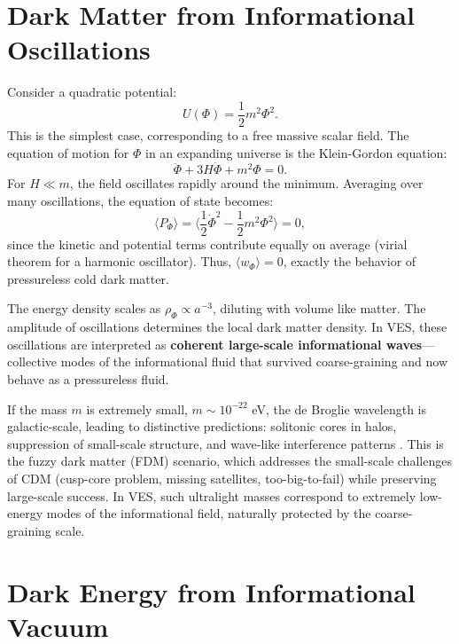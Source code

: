 \documentclass[12pt,a4paper]{book}
\begin{document}
\section{Dark Matter from Informational Oscillations}

Consider a quadratic potential:
\begin{equation}
    U(\Phi) = \frac12 m^2 \Phi^2.
\end{equation}
This is the simplest case, corresponding to a free massive scalar field. The equation of motion for $\Phi$ in an expanding universe is the Klein-Gordon equation:
\begin{equation}
    \ddot{\Phi} + 3H \dot{\Phi} + m^2 \Phi = 0.
\end{equation}
For $H \ll m$, the field oscillates rapidly around the minimum. Averaging over many oscillations, the equation of state becomes:
\begin{equation}
    \langle P_\Phi \rangle = \langle \frac12 \dot{\Phi}^2 - \frac12 m^2 \Phi^2 \rangle = 0,
\end{equation}
since the kinetic and potential terms contribute equally on average (virial theorem for a harmonic oscillator). Thus, $\langle w_\Phi \rangle = 0$, exactly the behavior of pressureless cold dark matter.

The energy density scales as $\rho_\Phi \propto a^{-3}$, diluting with volume like matter. The amplitude of oscillations determines the local dark matter density. In VES, these oscillations are interpreted as \textbf{coherent large-scale informational waves}—collective modes of the informational fluid that survived coarse-graining and now behave as a pressureless fluid.

If the mass $m$ is extremely small, $m \sim 10^{-22}$ eV, the de Broglie wavelength is galactic-scale, leading to distinctive predictions: solitonic cores in halos, suppression of small-scale structure, and wave-like interference patterns \cite{hui2017fuzzy}. This is the fuzzy dark matter (FDM) scenario, which addresses the small-scale challenges of CDM (cusp-core problem, missing satellites, too-big-to-fail) while preserving large-scale success. In VES, such ultralight masses correspond to extremely low-energy modes of the informational field, naturally protected by the coarse-graining scale.

\section{Dark Energy from Informational Vacuum}
\end{document}
